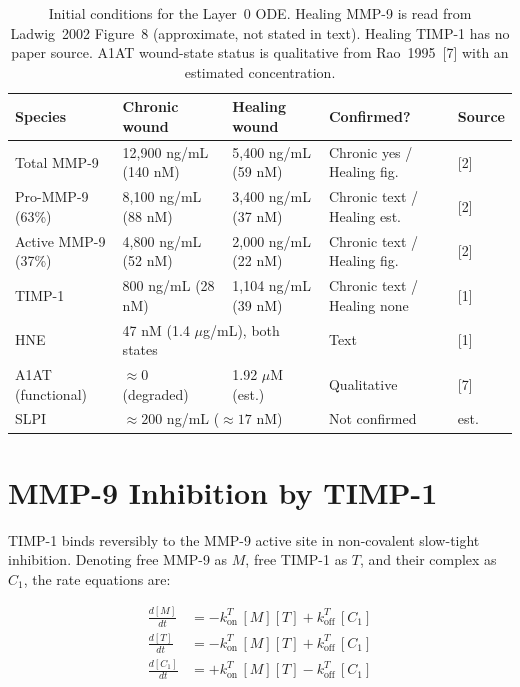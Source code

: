 \documentclass[10pt,a4paper]{article}
\numberwithin{equation}{section}
\newcommand{\kon}{k_{\text{on}}}
\newcommand{\koff}{k_{\text{off}}}
\newcommand{\cit}[1]{[#1]}   %
\begin{document}
\begin{table}[H]
\centering
\small\renewcommand{\arraystretch}{1.3}
\begin{tabular}{@{}lllll@{}}
\toprule
\textbf{Species} & \textbf{Chronic wound} & \textbf{Healing wound} & \textbf{Confirmed?} & \textbf{Source} \\
\midrule
Total MMP-9    & 12,900 ng/mL (140 nM) & 5,400 ng/mL (59 nM)  & Chronic yes / Healing fig. & \cit{2} \\
Pro-MMP-9 (63\%) & 8,100 ng/mL (88 nM) & 3,400 ng/mL (37 nM) & Chronic text / Healing est. & \cit{2} \\
Active MMP-9 (37\%) & 4,800 ng/mL (52 nM) & 2,000 ng/mL (22 nM) & Chronic text / Healing fig. & \cit{2} \\
\midrule
TIMP-1         & 800 ng/mL (28 nM)    & 1,104 ng/mL (39 nM) & Chronic text / Healing none & \cit{1} \\
HNE            & \multicolumn{2}{l}{47 nM (1.4 $\mu$g/mL), both states} & Text & \cit{1} \\
A1AT (functional) & $\approx 0$ (degraded) & 1.92 $\mu$M (est.) & Qualitative & \cit{7} \\
\midrule
SLPI           & \multicolumn{2}{l}{$\approx 200$ ng/mL ($\approx 17$ nM)} & Not confirmed & est. \\
\bottomrule
\end{tabular}
\caption{Initial conditions for the Layer~0 ODE. Healing MMP-9 is read from Ladwig~2002
Figure~8 (approximate, not stated in text). Healing TIMP-1 has no paper source. A1AT
wound-state status is qualitative from Rao~1995~\cit{7} with an estimated concentration.}
\label{tab:ics}
\end{table}

\section{MMP-9 Inhibition by TIMP-1}
\label{sec:mmp9}

TIMP-1 binds reversibly to the MMP-9 active site in non-covalent slow-tight inhibition.
Denoting free MMP-9 as $M$, free TIMP-1 as $T$, and their complex as $C_1$, the
rate equations are:

\begin{align}
\frac{d[M]}{dt} &= -\kon^T\,[M][T] + \koff^T\,[C_1] \label{eq:dM} \\
\frac{d[T]}{dt} &= -\kon^T\,[M][T] + \koff^T\,[C_1] \label{eq:dT} \\
\frac{d[C_1]}{dt} &= +\kon^T\,[M][T] - \koff^T\,[C_1] \label{eq:dC1}
\end{align}
\end{document}
